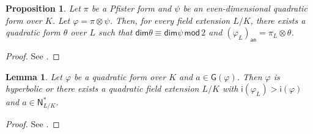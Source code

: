 \documentclass[twoside,11pt]{amsart}
\numberwithin{equation}{section}
\newtheorem{prop}[equation]{Proposition}
\newtheorem{lem}[equation]{Lemma}
\theoremstyle{definition}
\renewcommand{\dim}{\operatorname{\mathsf{dim}}}
\newcommand\N{\operatorname{N}}
\newcommand{\vf}{\varphi}
\renewcommand{\mod}{\,\mathsf{mod}\,}
\newcommand{\an}{\mathsf{an}}
\renewcommand{\N}{\mathsf{N}}
\newcommand{\G}{\mathsf{G}}
\renewcommand{\dim}{\mathsf{dim}}
\newcommand{\wi}{\mathsf{i}}
\begin{document}
\begin{prop}\label{index}
Let $\pi$ be a Pfister form and $\psi$ be an even-dimensional quadratic form over $K$. Let $\vf=\pi\otimes \psi$. Then, for every field extension $L/K$, there exists a quadratic form $\theta$ over $L$ such that $\dim\theta\equiv \dim\psi  \mod 2$ and $(\vf_L)_{\an}=\pi_L\otimes \theta$.
\end{prop}
\begin{proof}
    See \cite[Prop.~3.4]{AB26}. 
\end{proof}    


\begin{lem}\label{L:beta}
Let $\vf$ be a quadratic form over $K$ and $a\in\G(\vf)$.
Then  $\vf$ is hyperbolic or there exists a quadratic field extension $L/K$ with $\wi(\vf_L)>\wi(\vf)$ and $a\in\N_{L/K}^\ast$.
\end{lem}
\begin{proof}
    See \cite[Lemma~3.1]{AB25}.
\end{proof}
\end{document}
